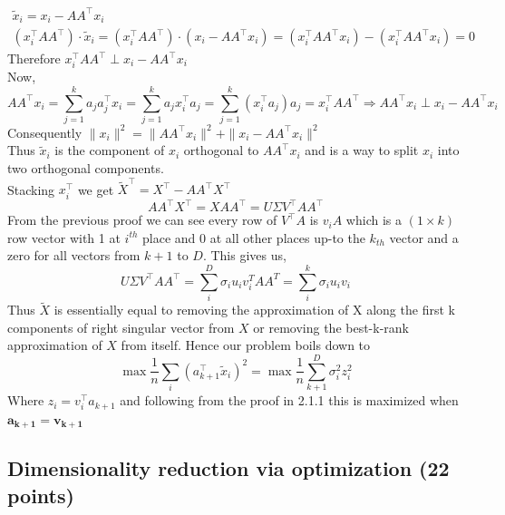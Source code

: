 \begin{enumerate}
\begin{soln}
    \begin{gather*}
        \tilde{x}_i = x_i - A A^\top x_i \\
        (x_i^\top AA^\top) \cdot \tilde{x}_i = (x_i^\top AA^\top) \cdot (x_i - A A^\top x_i) = (x_i^\top AA^\top x_i) - (x_i^\top AA^\top x_i) = 0
    \end{gather*} 
    Therefore $x_i^\top AA^\top \perp x_i - A A^\top x_i$ \\
    Now,
    $$
    A A^\top x_i = \sum_{j=1}^{k} a_ja_j^\top x_i = \sum_{j=1}^{k} a_jx_i^\top a_j = \sum_{j=1}^{k} (x_i^\top a_j)a_j = x_i^\top AA^\top \Rightarrow A A^\top x_i \perp x_i - A A^\top x_i
    $$
    Consequently $\|x_i\|^2 = \|A A^\top x_i\|^2 + \|x_i - A A^\top x_i\|^2$ \\
    Thus $\tilde{x}_i$ is the component of $x_i$ orthogonal to $AA^\top x_i$ and is a way to split $x_i$ into two orthogonal components.\\
    Stacking $x_i^\top$ we get $\tilde{X}^\top = X^\top - AA^\top X^\top$
    $$
        AA^\top X^\top = XAA^\top = U \Sigma V^\top A A^\top
    $$
    From the previous proof we can see every row of $V^\top A$ is $v_iA$ which is a $(1\times k)$ row vector with 1 at $i^{th}$ place and 0 at all other places up-to the $k_{th}$ vector and a zero for all vectors from $k+1$ to $D$. This gives us,
    $$
        U \Sigma V^\top A A^\top = \sum_i^D \sigma_i u_i v_i^T A A^T = \sum_i^k \sigma_i u_i v_i
    $$
    Thus $\tilde{X}$ is essentially equal to removing the approximation of X along the first k components of right singular vector from $X$ or removing the best-k-rank approximation of $X$ from itself. Hence our problem boils down to 
    $$
        \max \frac{1}{n} \sum_i (a_{k+1}^\top \tilde{x}_i)^2 = \max\frac{1}{n} \sum_{k+1}^D \sigma_i^2z_i^2
    $$
    Where $z_i = v_i^\top a_{k+1}$ and following from the proof in 2.1.1 this is maximized when $\mathbf{a_{k+1}=v_{k+1}}$
\end{soln}






\end{enumerate}


\subsection{Dimensionality reduction via optimization (22 points)}

